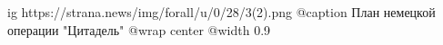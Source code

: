  
 
 
 
 

\ifcmt
  ig https://strana.news/img/forall/u/0/28/3(2).png
	@caption План немецкой операции "Цитадель"
  @wrap center
  @width 0.9
\fi
